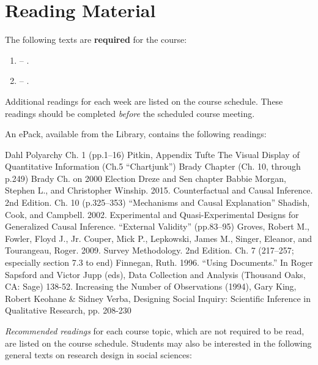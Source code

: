 \documentclass[12pt,a4paper]{article}
\newcommand{\reading}[2][]{\noindent -- {#1}\bibentry{#2}.\vspace{.25em}\\}
\begin{document}



\clearpage
\section{Reading Material}

The following texts are \textbf{required} for the course:

\begin{enumerate}
\item \reading{Gerring2012}
\item \reading{KellstedtWhitten2013}
\end{enumerate}

Additional readings for each week are listed on the course schedule. These readings should be completed \textit{before} the scheduled course meeting.


An ePack, available from the Library, contains the following readings:

Dahl Polyarchy Ch. 1 (pp.1--16)
Pitkin, Appendix
Tufte The Visual Display of Quantitative Information (Ch.5 ``Chartjunk'')
Brady Chapter (Ch. 10, through p.249)
Brady Ch. on 2000 Election
Dreze and Sen chapter
Babbie
Morgan, Stephen L., and Christopher Winship. 2015. Counterfactual and Causal Inference. 2nd Edition. Ch. 10 (p.325--353) ``Mechanisms and Causal Explanation''
Shadish, Cook, and Campbell. 2002. Experimental and Quasi-Experimental Designs for Generalized Causal Inference. ``External Validity'' (pp.83--95)
Groves, Robert M., Fowler, Floyd J., Jr. Couper, Mick P., Lepkowski, James M., Singer, Eleanor, and Tourangeau, Roger. 2009. Survey Methodology. 2nd Edition. Ch. 7 (217--257; especially section 7.3 to end)
Finnegan, Ruth. 1996. “Using Documents.” In Roger Sapsford and Victor Jupp (eds), Data Collection and Analysis (Thousand Oaks, CA: Sage) 138-52.
Increasing the Number of Observations (1994), Gary King, Robert Keohane & Sidney Verba, Designing Social Inquiry: Scientific Inference in Qualitative Research, pp. 208-230


\textit{Recommended readings} for each course topic, which are not required to be read, are listed on the course schedule. Students may also be interested in the following general texts on research design in social sciences:
\end{document}
